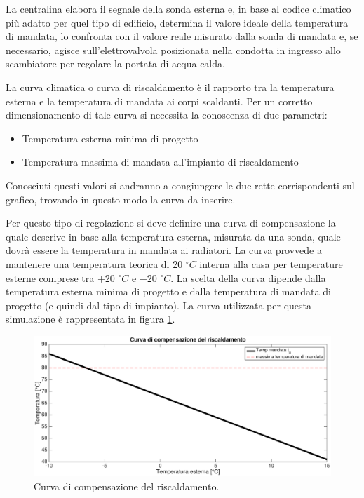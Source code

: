 \documentclass[laurea,oneside,11pt]{USiena_tesiLM}
\begin{document}
La centralina elabora il segnale della sonda esterna e, in base al codice climatico più adatto per quel tipo di edificio, determina il valore ideale della temperatura di mandata, lo confronta con il valore reale misurato dalla sonda di mandata e, se necessario, agisce sull'elettrovalvola posizionata nella condotta in ingresso allo scambiatore per regolare la portata di acqua calda.

La curva climatica o curva di riscaldamento è il rapporto tra la temperatura esterna e la temperatura di mandata ai corpi scaldanti. Per un corretto dimensionamento di tale curva si necessita la conoscenza di due parametri:
\begin{itemize}
\item Temperatura esterna minima di progetto
\item Temperatura massima di mandata all'impianto di riscaldamento
\end{itemize}
Conosciuti questi valori si andranno a congiungere le due rette corrispondenti sul grafico, trovando in questo modo la curva da inserire.


 Per questo tipo di regolazione si deve definire una curva di compensazione la quale descrive in base alla temperatura esterna, misurata da una sonda, quale dovrà essere la temperatura in mandata ai radiatori. La curva provvede a mantenere una temperatura teorica di 20 $^{\circ}C$ interna alla casa per temperature esterne comprese tra $+20$ $^{\circ}C$ e $-20$ $^{\circ}C$. La scelta della curva dipende dalla temperatura esterna minima di progetto e dalla temperatura di mandata di progetto (e quindi dal tipo di impianto). La curva  utilizzata per questa simulazione è rappresentata in figura \ref{fig:curva_comp}.
 
 \begin{figure}[!ht]
\centering
\includegraphics[width=\textwidth]{figure/curva_comp} 
\caption{Curva di compensazione del riscaldamento.}
\label{fig:curva_comp}
\end{figure}
\end{document}
